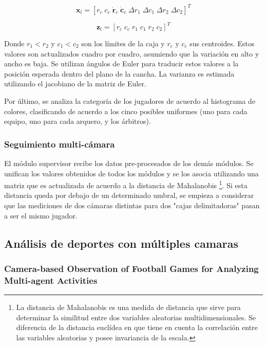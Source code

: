 \documentclass[a4paper,10pt]{article}
\begin{document}
\[
\mathbf{x}_l = [r_c \; c_c \;  \mathbf{\dot r}_c  \; \mathbf{\dot c}_c \;  \Delta r_1  \; \Delta c_1 \;  \Delta r_2 \;  \Delta c_2]^T
\]

\[
\mathbf{z}_l = [r_c \;  c_c  \; r_1  \; c_1  \; r_2  \; c_2]^T
\]

Donde $r_1 < r_2$ y $c_1 < c_2$ son los límites de la caja y
$r_c$ y $c_c$ sus centroides. Estos valores son
actualizados cuadro por cuadro, asumiendo que la variación en alto y ancho es
baja. Se utilizan ángulos de Euler para traducir estos valores a la posición
esperada dentro del plano de la cancha. La varianza es estimada utilizando el
jacobiano de la matriz de Euler.

Por último, se analiza la categoría de los
jugadores de acuerdo al histograma de colores, clasificando de acuerdo a los
cinco posibles uniformes (uno para cada equipo, uno para cada arquero, y los
árbitros).

\subsubsection{Seguimiento multi-cámara}

El módulo supervisor recibe los datos pre-procesados de los demás módulos.
Se unifican los valores obtenidos
de todos los módulos y se los asocia utilizando una matriz que es actualizada
de acuerdo a la distancia de Mahalanobis \footnote {La distancia de Mahalanobis
es una medida de distancia que sirve para determinar la similitud entre dos
variables aleatorias multidimensionales. Se diferencia de la distancia
euclídea en que tiene en cuenta la correlación entre
las variables aleatorias y posee invariancia de la escala.}. Si esta distancia queda por debajo de
un determinado umbral, se empieza a considerar que las mediciones de dos
cámaras distintas para dos "cajas delimitadoras" pasan a ser el mismo
jugador.

\subsection{Análisis de deportes con múltiples camaras}
\label{sec:var-camaras}

\subsubsection{Camera-based Observation of Football Games for Analyzing Multi-agent Activities}
\end{document}
